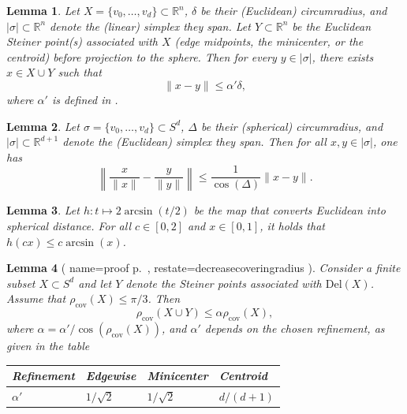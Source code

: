 \documentclass[10pt,a4paper]{amsart}
\newtheorem{lemma}{Lemma}
\newcommand{\Del}[1] { \mathrm{Del}(#1) } %
\newcommand{\R}{\mathbb R}
\newcommand{\geomreal}[1] { |#1| } %
\begin{document}
\begin{lemma}\label{lem:steiner_covering}
	Let $X=\{v_0,\dots,v_{d}\}\subset\R^{n}$, $\delta$ be their (Euclidean) circumradius, and $\geomreal{\sigma}\subset \R^{n}$ denote the (linear) simplex they span.
	Let $Y\subset\R^{n}$ be the Euclidean Steiner point(s) associated with $X$ (edge midpoints, the minicenter, or the centroid) before projection to the sphere.
	Then for every $y \in \geomreal{\sigma}$, there exists $x\in X\cup Y$ such that
	\[
	\|x-y\| \leq \alpha' \delta,
	\]
	where $\alpha'$ is defined in .	
\end{lemma}

\begin{lemma}\label{lem:spherical_distorsion_distances}
	Let $\sigma=\{v_0,\dots,v_{d}\}\subset S^d$, $\Delta$ be their (spherical) circumradius, and $\geomreal{\sigma}\subset \R^{d+1}$ denote the (Euclidean) simplex they span.
	Then for all $x,y \in \geomreal{\sigma}$, one has
	\[
	\left\|\frac{x}{\|x\|}-\frac{y}{\|y\|} \right\|
	\leq
	\frac{1}{\cos(\Delta)} \|x-y\|.
	\]
\end{lemma}

\begin{lemma}\label{lem:spherical_convexity}
	Let $h\colon t \mapsto 2\arcsin(t/2)$ be the map that converts Euclidean into spherical distance.
	For all $c \in [0,2]$ and $x\in[0,1]$, it holds that $h(cx)\leq c\arcsin(x)$.
\end{lemma}

\begin{lemma}[%
	name={proof p.~\pageref{proof:decreasecoveringradius}},%
	restate=decreasecoveringradius%
	]
	\label{lem:decreasecoveringradius}
	Consider a finite subset $X\subset S^d$ and let $Y$ denote the Steiner points associated with $\Del{X}$.
	Assume that $\rho_\mathrm{cov}(X)\leq \pi/3$. Then
	\[
	\rho_\mathrm{cov}(X\cup Y)\leq \alpha \rho_\mathrm{cov}(X),
	\]
	where $\alpha = \alpha'/\cos(\rho_\mathrm{cov}(X))$, and $\alpha'$ depends on the chosen refinement, as given in the table
	\begin{table}[H]
		\centering
		\begin{tabular}{l|lll}
			Refinement & Edgewise     & Minicenter   & Centroid  \\ \hline
			$\alpha'$  & $1/\sqrt{2}$ & $1/\sqrt{2}$ & $d/(d+1)$
		\end{tabular}
	\end{table}
\end{lemma}
\end{document}
